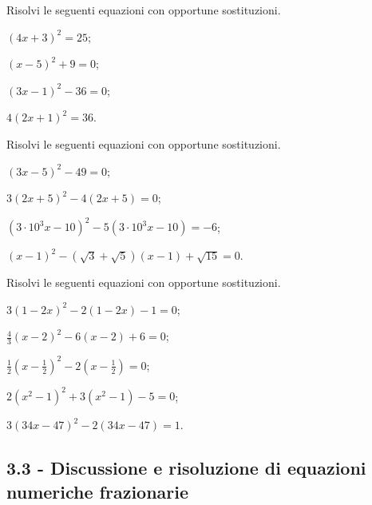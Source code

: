 \begin{esercizio}[\Ast]
 \label{ese:3.36}
Risolvi le seguenti equazioni con opportune sostituzioni.
\begin{multicols}{2}
\begin{enumeratea}
\item $(4x + 3)^{2} = 25$;
\item $(x-5)^{2} + 9 = 0$;
\item $(3x-1)^{2}-36 = 0$;
\item $4 (2x + 1)^{2} = 36$.
\end{enumeratea}
\end{multicols}
\end{esercizio}

\begin{esercizio}[\Ast]
\label{ese:3.37}
Risolvi le seguenti equazioni con opportune sostituzioni.
\begin{multicols}{2}
\begin{enumeratea}
\item $(3x-5)^{2}-49 = 0$;
\item $3 (2x + 5)^{2}-4 (2x + 5) = 0$;
\item $(3 \cdot 10^{3} x-10)^{2}-5 (3 \cdot 10^{3} x-10) = -6$;
\item $(x-1)^{2}-(\sqrt{3} + \sqrt{5}) (x-1) + \sqrt{15} =0$.
\end{enumeratea}
\end{multicols}
\end{esercizio}

\begin{esercizio}[\Ast]
\label{ese:3.38}
Risolvi le seguenti equazioni con opportune sostituzioni.
\begin{multicols}{2}
\begin{enumeratea}
\item $3 (1-2x)^{2}-2 (1-2x)-1 = 0$;
\item $\frac{4}{3} (x-2)^{2}-6 (x-2) + 6 = 0$;
\item $\frac{1}{2} \left(x-\frac{1}{2} \right)^{2}-2 \left(x -\frac{1}{2} \right) = 0$;
\item $2 (x^{2}-1)^{2} + 3 (x^{2}-1)-5 = 0$;
\item $3 (34 x-47)^{2}-2 (34 x-47) = 1$.
\end{enumeratea}
\end{multicols}
\end{esercizio}
\newpage
\subsection*{3.3 - Discussione e risoluzione di equazioni numeriche frazionarie}

